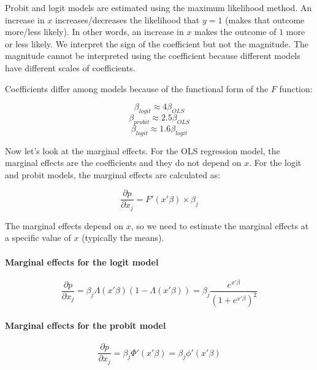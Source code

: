 
Probit and logit models are estimated using the maximum likelihood method. An increase in $x$
increases/decreases the likelihood that $y=1$ (makes that outcome more/less likely). In other words,
an increase in $x$ makes the outcome of $1$ more or less likely. We interpret the sign of the
coefficient but not the magnitude. The magnitude cannot be interpreted using the coefficient because
different models have different scales of coefficients.

Coefficients differ among models because of the functional form of the $F$ function:

$$\beta_{logit} \approx 4\beta_{OLS}$$
$$\beta_{probit} \approx 2.5\beta_{OLS}$$
$$\beta_{logit} \approx 1.6\beta_{logit}$$


Now let’s look at the marginal effects. For the OLS regression model, the marginal effects are the
coefficients and they do not depend on $x$. For the logit and probit models, the marginal effects
are calculated as:

\begin{equation}
    \frac{\partial p}{\partial x_j} = F'(x'\beta) \times \beta_j
\end{equation}

The marginal effects depend on $x$, so we need to estimate the marginal effects at a specific value
of $x$ (typically the means).

\paragraph{Marginal effects for the logit model}
\begin{equation}
    \frac{\partial p}{\partial x_j} = \beta_j\Lambda(x'\beta)(1-\Lambda(x'\beta)) = \beta_j\frac{e^{x'\beta}}{(1+e^{x'\beta})^2}
\end{equation}

\paragraph{Marginal effects for the probit model}
\begin{equation}
    \frac{\partial p}{\partial x_j} = \beta_j\Phi'(x'\beta) = \beta_j\phi'(x'\beta)
\end{equation}

